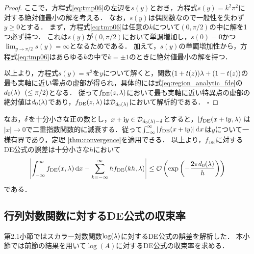 \documentclass[12pt,a4paper,uplatex,dvipdfmx]{jsarticle}
\newcommand{\fde}{f_{\mathrm{DE}}}
\newcommand{\sumkii}{\sum_{k=-\infty}^\infty}
\begin{document}
\begin{proof}
    ここで，方程式\eqref{eq:tmp06}の左辺を$s(y)$とおき，方程式$s(y)=k^2\pi^2$に対する絶対値最小の解を考える．
    なお，$s(y)$は偶関数なので一般性を失わず$y\ge 0$とする．
    まず，方程式\eqref{eq:tmp06}は任意の$k$について$(0,\pi/2)$の中に解を1つ必ず持つ．
    これは$s(y)$が$(0,\pi/2)$において単調増加し，$s(0)=0$かつ$\lim_{y\to \pi/2}s(y)=\infty$となるためである．
    加えて，$s(y)$の単調増加性から，方程式\eqref{eq:tmp06}はあらゆる$k$の中で$k=\pm 1$のときに絶対値最小の解を持つ．

    以上より，方程式$s(y)=\pi^2$を$y$について解くと，関数$(1+t(z))\lambda + (1-t(z))$の最も実軸に近い零点の虚部が得られ，具体的には式\eqref{eq:region_analytic_fde}の$d_0(\lambda)~~(\le \pi/2)$となる．
    従って$\fde(z,\lmd)$において最も実軸に近い特異点の虚部の絶対値は$d_0(\lambda)$であり，$\fde(z,\lmd)$は$\mathcal{D}_{d_0(\lambda)}$において解析的である．
    \hfill $\square$
  \end{proof}

  なお，$\delta$を十分小さな正の数とし，$x+\mathrm{i} y\in\mathcal{D}_{d_0(\lambda) - \delta}$とすると，$|\fde(x+\rmi y,\lmd)|$は$|x|\to 0$で二重指数関数的に減衰する．従って$\intii |\fde(x+\rmi y)| \dd{x}$は$y$について一様有界であり，定理 \ref{thm:convergence}を適用できる．
  以上より，$\fde$に対するDE公式の誤差は十分小さな$h$において
  \begin{align}\label{eq:err_de_sc}
    \left|\intii{\fde(x,\lmd)}\dd{x}-\sumkii h\fde(kh,\lmd)\right|
    \le \calO\left(\exp\left(-\frac{2\pi d_0(\lmd)}{h}\right)\right)
  \end{align}
  である．


  \subsection{行列対数関数に対するDE公式の収束率}
  第2.1小節ではスカラー対数関数$\log(\lambda)$に対するDE公式の誤差を解析した．
  本小節では前節の結果を用いて$\log(A)$に対するDE公式の収束率を求める．
\end{document}
